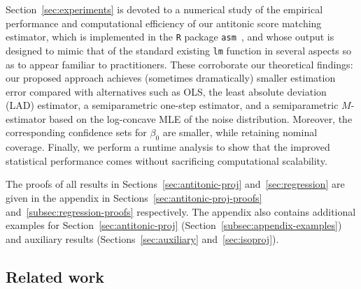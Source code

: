 \documentclass[a4paper]{article}
\theoremstyle{definition}
\begin{document}
Section~\ref{sec:experiments} is devoted to a numerical study of the empirical performance and computational efficiency of our antitonic score matching estimator, which is implemented in the \texttt{R} package \texttt{asm}~\citep{kao24asm}, and whose output is designed to mimic that of the standard existing \texttt{lm} function in several aspects so as to appear familiar to practitioners.  These corroborate our theoretical findings: our proposed approach achieves (sometimes dramatically) smaller estimation error  compared with alternatives such as OLS, the least absolute deviation (LAD) estimator, a semiparametric one-step estimator, and a semiparametric $M$-estimator based on the log-concave MLE of the noise distribution. Moreover, the corresponding confidence sets for $\beta_0$ are smaller, while retaining nominal coverage. Finally, we perform a runtime analysis to show that the improved statistical performance comes without sacrificing computational scalability. 

The proofs of all results in Sections~\ref{sec:antitonic-proj} and~\ref{sec:regression} are given in the appendix in Sections~\ref{sec:antitonic-proj-proofs} and~\ref{subsec:regression-proofs} respectively.  The appendix also contains additional examples for Section~\ref{sec:antitonic-proj} (Section~\ref{subsec:appendix-examples}) and auxiliary results (Sections~\ref{sec:auxiliary} and~\ref{sec:isoproj}).

\subsection{Related work}
\end{document}
